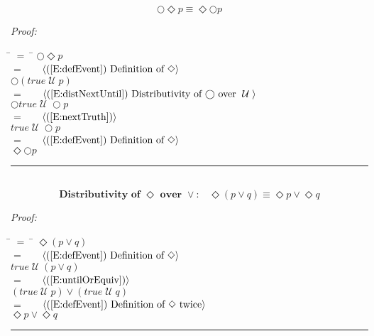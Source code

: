 \documentclass[fleqn, leqno]{article}
\newcommand{\lgap}{2pt}                             %
\newcommand{\mymathindent}{24pt}                      %
\newcommand{\until}{\;\mathcal{U}\;}
\newcommand{\next}{\bigcirc}
\newcommand{\event}{\Diamond}
\newcommand{\myqed}{\hfill\rule[-.23ex]{1.2ex}{2.0ex}}
\newcommand{\Gll} {\langle}                         %
\newcommand{\Ggg} {\rangle}                         %
\newcommand{\Hint}[1]     {\ \ \ $\Gll              \mbox{#1} \Ggg$ }   %
\begin{document}
\begin{equation}\label{E:dNextEvent}
\next\event p \equiv \event\next p
\end{equation}

\emph{Proof:}
\begin{tabbing}
\hspace{\mymathindent} \= $= \;$ \= \kill
  \> \>   $\next\event p$\\[\lgap]
  \> $=$  \>  \Hint{(\ref{E:defEvent}) Definition of $\event$}\\[\lgap]
  \> \>   $\next(true \until p)$\\[\lgap]
  \> $=$  \>  \Hint{(\ref{E:distNextUntil}) Distributivity of $\next$ over $\until$}\\[\lgap]
  \> \>   $\next true \until \next p$\\[\lgap]
  \> $=$  \>  \Hint{(\ref{E:nextTruth})}\\[\lgap]
  \> \>   $true \until \next p$\\[\lgap]
  \> $=$  \>  \Hint{(\ref{E:defEvent}) Definition of $\event$}\\[\lgap]
  \> \>   $\event\next p$\\[\lgap]
\end{tabbing}
\myqed\\[\lgap]


\begin{equation}\label{E:distEventOr}
\textbf{Distributivity of $\event$ over $\lor$:}\quad \event(p \lor q) \equiv \event p \lor \event q
\end{equation}

\emph{Proof:}
\begin{tabbing}
\hspace{\mymathindent} \= $= \;$ \= \kill
  \> \>   $\event(p \lor q)$\\[\lgap]
  \> $=$  \>  \Hint{(\ref{E:defEvent}) Definition of $\event$}\\[\lgap]
  \> \>   $true \until (p \lor q)$\\[\lgap]
  \> $=$  \>  \Hint{(\ref{E:untilOrEquiv})}\\[\lgap]
  \> \>   $(true \until p) \lor (true \until q)$\\[\lgap]
  \> $=$  \>  \Hint{(\ref{E:defEvent}) Definition of $\event$ twice}\\[\lgap]
  \> \>   $\event p \lor \event q$\\[\lgap]
\end{tabbing}
\myqed\\[\lgap]
\end{document}
